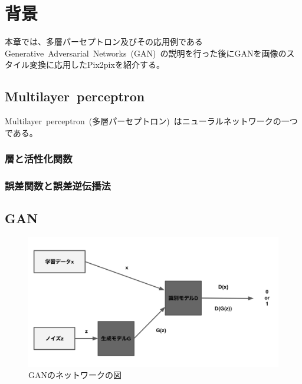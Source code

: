 
\chapter{背景}

本章では、多層パーセプトロン及びその応用例であるGenerative~Adversarial~Networks~(GAN)~の説明を行った後にGANを画像のスタイル変換に応用したPix2pixを紹介する。

\section{Multilayer~perceptron}

Multilayer~perceptron~(多層パーセプトロン)~はニューラルネットワークの一つである。


\subsection{層と活性化関数}



\subsection{誤差関数と誤差逆伝播法}


\section{GAN}

\begin{figure}[H]
\begin{center}
\includegraphics[width=\hsize]{figure/GAN_net.png}
\caption{GANのネットワークの図}
\label{fig:GAN_net}
\end{center}
\end{figure}


